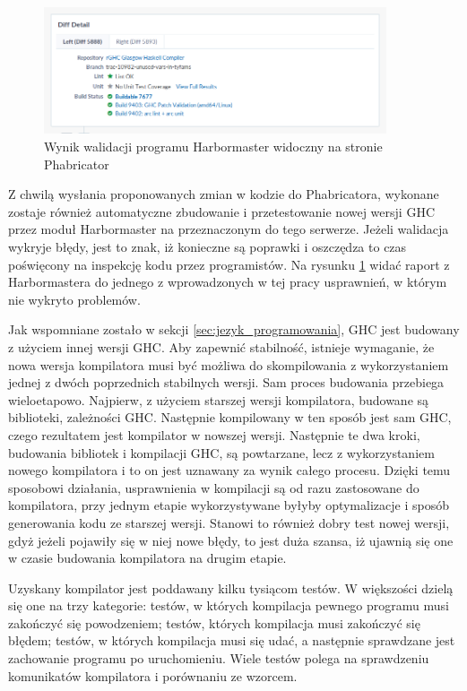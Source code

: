 \begin{figure}[ht]
    \centering
    \includegraphics[width=0.9\textwidth]{images/Phabricator_validate}
    \caption{Wynik walidacji programu Harbormaster widoczny na stronie Phabricator}
    \label{fig:Phabricator_validate}
\end{figure}

Z chwilą wysłania proponowanych zmian w kodzie do Phabricatora, wykonane zostaje również automatyczne zbudowanie i przetestowanie nowej wersji GHC przez moduł Harbormaster na przeznaczonym do tego serwerze. Jeżeli walidacja wykryje błędy, jest to znak, iż konieczne są poprawki i oszczędza to czas poświęcony na inspekcję kodu przez programistów. Na rysunku \ref{fig:Phabricator_validate} widać raport z Harbormastera do jednego z wprowadzonych w tej pracy usprawnień, w którym nie wykryto problemów.

Jak wspomniane zostało w sekcji \ref{sec:jezyk_programowania}, GHC jest budowany z użyciem innej wersji GHC. Aby zapewnić stabilność, istnieje wymaganie, że nowa wersja kompilatora musi być możliwa do skompilowania z wykorzystaniem jednej z dwóch poprzednich stabilnych wersji\cite{WikiFixingBugs}. Sam proces budowania przebiega wieloetapowo. Najpierw, z użyciem starszej wersji kompilatora, budowane są biblioteki, zależności GHC. Następnie kompilowany w ten sposób jest sam GHC, czego rezultatem jest kompilator w nowszej wersji. Następnie te dwa kroki, budowania bibliotek i kompilacji GHC, są powtarzane, lecz z wykorzystaniem nowego kompilatora i to on jest uznawany za wynik całego procesu\cite{WikiBuildSystem}. Dzięki temu sposobowi działania, usprawnienia w kompilacji są od razu zastosowane do kompilatora, przy jednym etapie wykorzystywane byłyby optymalizacje i sposób generowania kodu ze starszej wersji. Stanowi to również dobry test nowej wersji, gdyż jeżeli pojawiły się w niej nowe błędy, to jest duża szansa, iż ujawnią się one w czasie budowania kompilatora na drugim etapie.

Uzyskany kompilator jest poddawany kilku tysiącom testów. W większości dzielą się one na trzy kategorie: testów, w których kompilacja pewnego programu musi zakończyć się powodzeniem; testów, których kompilacja musi zakończyć się błędem; testów, w których kompilacja musi się udać, a następnie sprawdzane jest zachowanie programu po uruchomieniu. Wiele testów polega na sprawdzeniu komunikatów kompilatora i porównaniu ze wzorcem.
